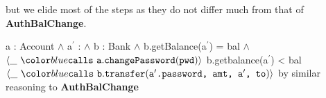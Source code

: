 but we elide most of the steps as they do not differ much from that of \textbf{AuthBalChange}.\\
{
	\begin{proofexample}
			{\proofstepwithrule
				{\onlyIfSingleEx
						{a : Account $\wedge$ a$^\prime$ : $\wedge$ b : Bank $\wedge$ b.getBalance(a$^\prime$) = bal $\wedge$ $\calls{\_}{\prg{a}}{\prg{changePassword}}{\prg{pwd}}$}
						{b.getbalance(a$^\prime$) < bal}
						{$\calls{\_}{\prg{b}}{\prg{transfer}}{\prg{a$^\prime$.password, amt, a$^\prime$, to}}$}
						}
					{by similar reasoning to \textbf{AuthBalChange}}
			}
		\endproofsteps
	\end{proofexample}
}

